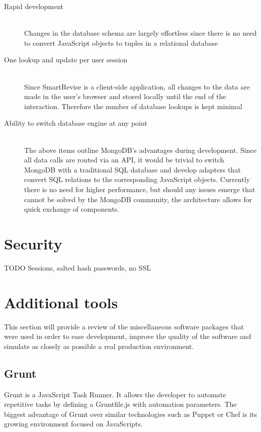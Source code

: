 \documentclass[bsc,frontabs,twoside,singlespacing,parskip]{infthesis}     %
\begin{document}
		\begin{description}
			\item[Rapid development] \hfill \\
				Changes in the database schema are largely effortless since there is no need to convert JavaScript objects to tuples in a relational database
			\item[One lookup and update per user session] \hfill \\
				Since SmartRevise is a client-side application, all changes to the data are made in the user's browser and stored locally until the end of the interaction. Therefore the number of database lookups is kept minimal
			\item[Ability to switch database engine at any point] \hfill \\
				The above items outline MongoDB's advantages during development. Since all data calls are routed via an API, it would be trivial to switch MongoDB with a traditional SQL database and develop adapters that convert SQL relations to the corresponding JavaScript objects. Currently there is no need for higher performance, but should any issues emerge that cannot be solved by the MongoDB community, the architecture allows for quick exchange of components.
		\end{description}


	\section{Security}\label{security}
	TODO
	Sessions, salted hash passwords, no SSL

	\section{Additional tools}\label{tools}

		This section will provide a review of the miscellaneous software packages that were used in order to ease development, improve the quality of the software and simulate as closely as possible a real production environment.

		\subsection{Grunt}
			Grunt is a JavaScript Task Runner. It allows the developer to automate repetitive tasks by defining a Gruntfile.js with automation parameters. The biggest advantage of Grunt over similar technologies such as Puppet or Chef is its growing environment focused on JavaScripts.
\end{document}
